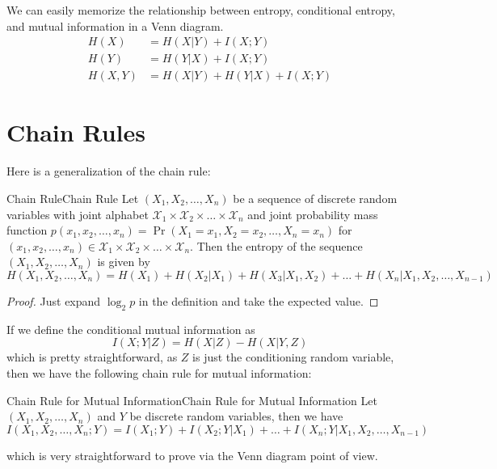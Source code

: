 \documentclass[../main.tex]{subfiles}
\begin{document}
\begin{remark}
  We can easily memorize the relationship between entropy, conditional entropy, and mutual information in a Venn diagram.
  \begin{equation*}
    \begin{aligned}
      H(X) &= H(X|Y) + I(X;Y)\\
      H(Y) &= H(Y|X) + I(X;Y)\\
      H(X,Y) &= H(X|Y) + H(Y|X) + I(X;Y)
    \end{aligned}
  \end{equation*}
\end{remark}

\section{Chain Rules}
Here is a generalization of the chain rule:
\begin{theorem}{Chain Rule}{Chain Rule}
  Let $(X_1, X_2, \ldots, X_n)$ be a sequence of discrete random variables with joint alphabet $\mathcal{X}_1 \times \mathcal{X}_2 \times \ldots \times \mathcal{X}_n$ and joint probability mass function $p(x_1, x_2, \ldots, x_n) = \Pr(X_1=x_1, X_2=x_2, \ldots, X_n=x_n)$ for $(x_1, x_2, \ldots, x_n) \in \mathcal{X}_1 \times \mathcal{X}_2 \times \ldots \times \mathcal{X}_n$. Then the entropy of the sequence $(X_1, X_2, \ldots, X_n)$ is given by
  \begin{equation}
    H(X_1, X_2, \ldots, X_n) = H(X_1) + H(X_2|X_1) + H(X_3|X_1,X_2) + \ldots + H(X_n|X_1,X_2,\ldots,X_{n-1})
  \end{equation}
\end{theorem}
\begin{proof}
  Just expand $\log_2 p$ in the definition and take the expected value.
\end{proof}

If we define the conditional mutual information as
\begin{equation}
  I(X;Y|Z) = H(X|Z) - H(X|Y,Z)
\end{equation}
which is pretty straightforward, as $Z$ is just the conditioning random variable, then we have the following chain rule for mutual information:
\begin{theorem}{Chain Rule for Mutual Information}{Chain Rule for Mutual Information}
  Let $(X_1, X_2, \ldots, X_n)$ and $Y$ be discrete random variables, then we have
  \begin{equation}
    I(X_1, X_2, \ldots, X_n; Y) = I(X_1; Y) + I(X_2; Y|X_1) + \ldots + I(X_n; Y|X_1,X_2,\ldots,X_{n-1})
  \end{equation}
\end{theorem}
which is very straightforward to prove via the Venn diagram point of view.
\end{document}
